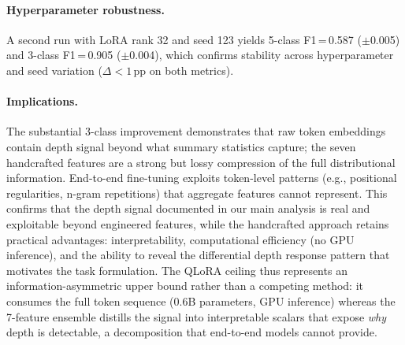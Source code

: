 \paragraph{Hyperparameter robustness.}
A second run with LoRA rank 32 and seed 123 yields 5-class F1\,=\,0.587 ($\pm$0.005) and 3-class F1\,=\,0.905 ($\pm$0.004), which confirms stability across hyperparameter and seed variation ($\Delta < 1$\,pp on both metrics).

\paragraph{Implications.}
The substantial 3-class improvement demonstrates that raw token embeddings contain depth signal beyond what summary statistics capture; the seven handcrafted features are a strong but lossy compression of the full distributional information.
End-to-end fine-tuning exploits token-level patterns (e.g., positional regularities, n-gram repetitions) that aggregate features cannot represent.
This confirms that the depth signal documented in our main analysis is real and exploitable beyond engineered features, while the handcrafted approach retains practical advantages: interpretability, computational efficiency (no GPU inference), and the ability to reveal the differential depth response pattern that motivates the task formulation.
The QLoRA ceiling thus represents an information-asymmetric upper bound rather than a competing method: it consumes the full token sequence (0.6B parameters, GPU inference) whereas the 7-feature ensemble distills the signal into interpretable scalars that expose \emph{why} depth is detectable, a decomposition that end-to-end models cannot provide.
